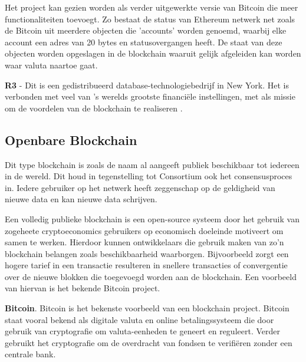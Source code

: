 Het project kan gezien worden als verder uitgewerkte versie van Bitcoin die meer functionaliteiten toevoegt. Zo bestaat de status van Ethereum netwerk net zoals de Bitcoin uit meerdere objecten die 'accounts' worden genoemd, waarbij elke account een adres van 20 bytes en statusovergangen heeft. De staat van deze objecten worden opgeslagen in de blockchain waaruit gelijk afgeleiden kan worden waar valuta naartoe gaat.\cite{whitePaperEthereum}

\textbf{R3} - Dit is een gedistribueerd database-technologiebedrijf in New York. Het is verbonden met veel van 's werelds grootste financiële instellingen, met als missie om de voordelen van de blockchain te realiseren \cite{R3}.

\subsection{Openbare Blockchain}
Dit type blockchain is zoals de naam al aangeeft publiek beschikbaar tot iedereen in de wereld. Dit houd in tegenstelling tot Consortium ook het consensusproces in. Iedere gebruiker op het netwerk heeft zeggenschap op de geldigheid van nieuwe data en kan nieuwe data schrijven. \par

Een volledig publieke blockchain is een open-source systeem door het gebruik van zogeheete cryptoeconomics gebruikers op economisch doeleinde motiveert om samen te werken. Hierdoor kunnen ontwikkelaars die gebruik maken van zo'n blockchain belangen zoals beschikbaarheid waarborgen. Bijvoorbeeld zorgt een hogere tarief in een transactie resulteren in snellere transacties of convergentie over de nieuwe blokken die toegevoegd worden aan de blockchain. Een voorbeeld van hiervan is het bekende Bitcoin project.

\textbf{Bitcoin}. Bitcoin is het bekenste voorbeeld van een blockchain project. Bitcoin staat vooral bekend als digitale valuta en online betalingssysteem die door gebruik van cryptografie om valuta-eenheden te geneert en reguleert. Verder gebruikt het cryptografie om de overdracht van fondsen te verifiëren zonder een centrale bank. \par

\newpage